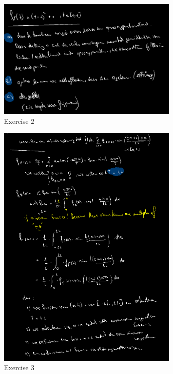 \documentclass[a4paper]{report}
\begin{document}
\begin{figure}[H]
	\centering
	\includegraphics[width=0.8\textwidth]{assets/bord_9_ex_2.png}
	\caption{Exercise 2}
	\label{fig:bord_9_ex_2}
\end{figure}



\begin{figure}[H]
	\centering
	\includegraphics[width=0.8\textwidth]{assets/bord_9_ex_3.png}
	\caption{Exercise 3}
	\label{fig:bord_9_ex_3}
\end{figure}
\end{document}
